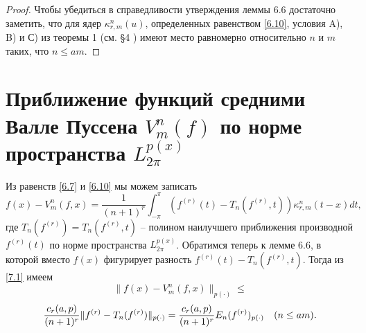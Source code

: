 \begin{proof}
Чтобы убедиться в справедливости утверждения леммы 6.6 достаточно заметить, что  для ядер $\kappa_{r,m}^{n}(u)$, определенных равенством \eqref{6.10}, условия  A), B) и С) из теоремы 1 (см. \S 4 ) имеют место равномерно относительно  $n$ и $m$ таких, что $n\le am$.
\end{proof}






\section{Приближение функций средними Валле Пуссена $V_m^n(f)$ по норме пространства $ L^{p(x)}_{2\pi}$  }\label{s7}

Из равенств \eqref{6.7} и  \eqref{6.10} мы можем записать
\begin{equation}\label{7.1}
  f(x)-V_m^n(f,x)= \frac{1}{(n+1)^r}\int_{-\pi}^\pi (f^{(r)}(t)-T_n(f^{(r)},t))\kappa_{r,m}^n(t-x)dt,
\end{equation}
где $T_n(f^{(r)})=T_n(f^{(r)},t)$ -- полином наилучшего приближения производной  $f^{(r)}(t)$ по норме пространства
 $L^{p(x)}_{2\pi}$. Обратимся теперь к лемме 6.6, в которой вместо $f(x)$ фигурирует разность $f^{(r)}(t)-T_n(f^{(r)},t)$. Тогда из \eqref{7.1} имеем
 $$
 \|f(x)-V_m^n(f,x)\|_{p(\cdot)}\le
  $$
 \begin{equation}\label{7.2}
  {c_r(a,p)\over (n+1)^r}\|f^{(r)}-T_n(f^{(r)})\|_{p(\cdot)}={c_r(a,p)\over (n+1)^r}E_n(f^{(r)})_{p(\cdot)} \quad (n\le am) .
 \end{equation}

